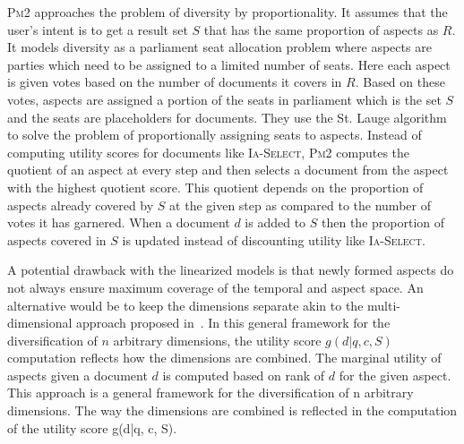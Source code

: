 \textsc{Pm2} approaches the problem of diversity by proportionality. It assumes that the user's intent is to get a result set $S$ that has the same proportion of aspects as $R$. It models diversity as a parliament seat allocation problem where aspects are parties which need to be assigned to a limited number of seats. Here each aspect is given votes based on the number of documents it covers in $R$. Based on these votes, aspects are assigned a portion of the seats in parliament which is the set $S$ and the seats are placeholders for documents. They use the St. Lauge algorithm to solve the problem of proportionally assigning seats to aspects. Instead of computing utility scores for documents like \textsc{Ia-Select}, \textsc{Pm2} computes the quotient of an aspect at every step and then selects a document from the aspect with the highest quotient score. This quotient depends on the proportion of aspects already covered by $S$ at the given step as compared to the number of votes it has garnered. When a document $d$ is added to $S$ then the proportion of aspects covered in $S$ is updated instead of discounting utility like \textsc{Ia-Select}.



A potential drawback with the linearized models is that newly formed aspects do not always ensure maximum coverage of the temporal and aspect space. An alternative would be to keep the dimensions separate akin to the multi-dimensional approach proposed in~\cite{mdiv}. In this general framework for the diversification of $n$ arbitrary dimensions, the utility score $g(d|q, c, S)$ computation reflects how the dimensions are combined. The marginal utility of aspects given a document $d$ is computed based on rank of $d$ for the given aspect. This approach is a general framework for the diversification of n arbitrary dimensions. The way the dimensions are combined is reflected in the computation of the utility score g(d|q, c, S).

